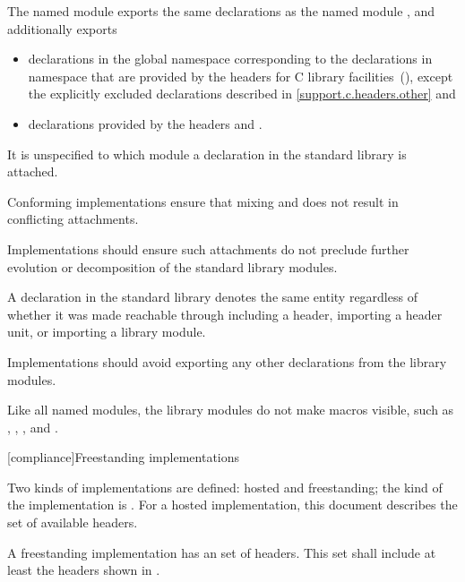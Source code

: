 \pnum
The named module  exports the same declarations as
the named module , and
additionally exports
\begin{itemize}
\item
declarations in the global namespace
corresponding to the declarations in namespace 
that are provided by
the \Cpp{} headers for C library facilities~(),
except the explicitly excluded declarations
described in \ref{support.c.headers.other} and
\item
declarations provided by
the headers  and .
\end{itemize}

\pnum
It is unspecified to which module a declaration in the standard library
is attached.
\begin{note}
Conforming implementations ensure that mixing
 and  does not result in
conflicting attachments.
\end{note}
\recommended
Implementations should ensure such attachments do not preclude
further evolution or decomposition of the standard library modules.

\pnum
A declaration in the standard library denotes the same entity regardless of
whether it was made reachable through
including a header,
importing a header unit, or
importing a \Cpp{} library module.

\pnum
\recommended
Implementations should avoid exporting any other declarations
from the \Cpp{} library modules.

\begin{note}
Like all named modules, the \Cpp{} library modules
do not make macros visible, such as
,
,
, and
.
\end{note}

[compliance]{Freestanding implementations}
%

\pnum
Two kinds of implementations are defined:
%
hosted and freestanding;
the kind of the implementation is
.
For a hosted implementation, this document
describes the set of available headers.

\pnum
A freestanding implementation has an
 set of headers. This set shall
include at least the headers shown in .

